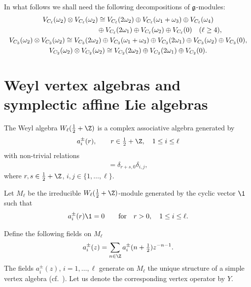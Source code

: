 \documentclass[pdftex]{sigma}
\begin{document}
In what follows we shall need the following decompositions of $\frak
g$-modules:
%
\begin{gather}
V_{C_{\ell }} (\omega_2) \otimes V_{C_{\ell }} ( \omega_2) \cong
V_{C_{\ell }} (2 \omega_2)\oplus V_{C_{\ell }} ( \omega_1 +
\omega_3) \oplus V_{C_{\ell }} (\omega_4)
\nonumber \\
\hphantom{V_{C_{\ell }} (\omega_2) \otimes V_{C_{\ell }} ( \omega_2) \cong}{}
 \oplus V_{C_{\ell }} (2\omega_1) \oplus
V_{C_{\ell}} ( \omega_2) \oplus V_{C_{\ell }} (0)  \quad ( \ell \ge 4),  \nonumber \\
 V_{C_{3}} (\omega_2) \otimes V_{C_{3}} ( \omega_2) \cong
 V_{C_{3}} (2 \omega_2)\oplus V_{C_{3}} ( \omega_1 +
\omega_3) \oplus V_{C_{3}} (2\omega_1) \oplus
V_{C_{3}} ( \omega_2) \oplus V_{C_{3}} (0), \nonumber \\
 V_{C_{2}}(\omega _2) \otimes V_{C_{2}}(\omega _2) \cong
V_{C_{2}}(2 \omega _2) \oplus V_{C_{2}}(2 \omega _1) \oplus V_{C_{2}}(0). \label{tens-pr-decomp}
 \end{gather}



\section{Weyl vertex algebras and symplectic af\/f\/ine Lie algebras}

The Weyl algebra $W_{\ell}( \tfrac{1}{2} + {\Z})$ is a complex
associative algebra generated by
\[  a ^{\pm} _{i}(r),  \qquad   r  \in \tfrac{1}{2} + {\Z}, \quad 1 \le i
\le \ell
\] with non-trivial relations
\begin{gather*}
 [a_{i} ^{+}(r)  , a_{j} ^{-}(s)  ]  =\delta_{r+s,0} \delta_{i,j},
\end{gather*}
where $r, s \in {\tfrac{1}{2}}+ {\Z}$, $ i, j \in \{1, \dots, \ell
\}$.



 Let $M_{\ell}$ be the irreducible $W_{\ell}( \tfrac{1}{2} + {\Z})$-module generated by
 the
cyclic vector ${\1}$ such that
\[ a^{\pm} _i  (r) {\1}     =  0 \qquad \mbox{for} \quad r > 0 ,  \quad 1
\le i \le \ell.
\]



Def\/ine the following   f\/ields on $M_{\ell}$
%
\[   a_i ^{\pm }(z) = \sum_{ n \in   {\Z}
 } a_i ^{\pm }(n+ \tfrac{1}{2} )  z ^{-n- 1}.
 \]
 The f\/ields $a_{i} ^{\pm }(z)$, $i =1, \dots, \ell$ generate on $M_{\ell}$  the
unique structure of a simple vertex algebra (cf.~\cite{FrB, K}). Let us denote the corresponding vertex operator by $Y$.
\end{document}
